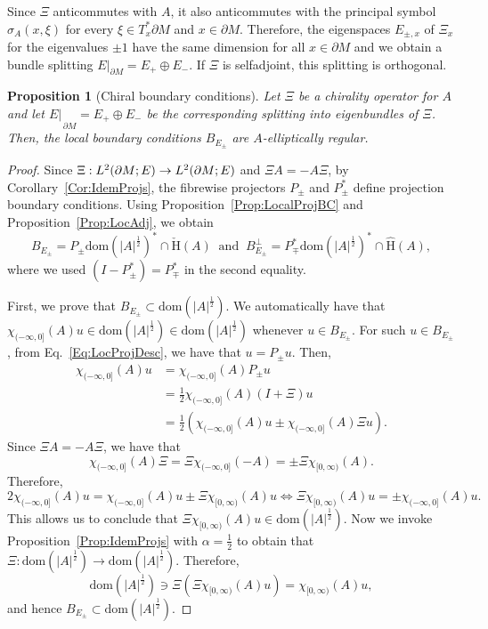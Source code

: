 \documentclass[a4paper,10pt,reqno]{amsart}
\newcommand{\rest}[1]{{{\lvert_{}}_{}}_{#1}}
\newcommand{\cbrac}[1]{\left(#1\right)}
\newcommand{\modulus}[1]{|#1|}
\newcommand{\Lp}[2][{}]{{\rm L}^{#2}_{\rm #1}}%
\newcommand{\checkH}{\check{\mathrm{H}}}
\newcommand{\hatH}{\hat{\mathrm{H}}}
\newcommand{\dom}{\mathrm{dom}}
\newcommand{\dM}{\partial M}
\newtheorem{proposition}[theorem]{Proposition}
\theoremstyle{definition}
\begin{document}
Since $\Xi$ anticommutes with $A$, it also anticommutes with the principal symbol $\sigma_A(x,\xi)$ for every $\xi\in T_x^*\dM$ and $x\in \dM$.
Therefore, the eigenspaces $E_{\pm,x}$ of $\Xi_x$ for the eigenvalues $\pm 1$ have the same dimension for all $x\in\dM$ and we obtain a bundle splitting $E|_{\dM}=E_+\oplus E_-$.
If $\Xi$ is selfadjoint, this splitting is orthogonal.

\begin{proposition}[Chiral boundary conditions]
\label{Prop:ChiralReg}
Let $\Xi$ be a  chirality operator for $A$ and let $E\rest{\dM} = E_+ \oplus E_-$ be the corresponding splitting into eigenbundles of $\Xi$.
Then, the local boundary conditions $B_{E_{\pm}}$ are $A$-elliptically regular.
\end{proposition}
\begin{proof}
Since $\Xi:\Lp{2}(\dM;E) \to \Lp{2}(\dM;E)$ and $\Xi A = - A \Xi$, by Corollary~\ref{Cor:IdemProjs}, the fibrewise projectors $P_{\pm}$ and $P_{\pm}^\ast$ define projection boundary conditions.
Using Proposition~\ref{Prop:LocalProjBC} and Proposition~\ref{Prop:LocAdj}, we obtain
\begin{equation}
\label{Eq:LocProjDesc}
B_{E_{\pm}} 
= 
P_{\pm} \dom(\modulus{A}^{\frac12})^\ast \cap \checkH(A)\ 
\text{ and }\ 
B_{E_{\pm}}^{\perp} 
= 
P_{\mp}^\ast  \dom(\modulus{A}^{\frac12})^\ast \cap \hatH(A),
\end{equation}
where we used $(I - P_{\pm}^\ast) = P_{\mp}^\ast$ in the second equality.

First, we prove that $B_{E_{\pm}} \subset \dom(\modulus{A}^\frac12)$.
We automatically have that $\chi_{(-\infty,0]}(A)u \in \dom(\modulus{A}^{\frac12}) \in \dom(\modulus{A}^\frac12)$ whenever $u \in B_{E_{\pm}}$.
For such $u \in B_{E_{\pm}}$, from Eq.~\eqref{Eq:LocProjDesc}, we have that $u = P_{\pm} u$.
Then,
\begin{align*}
\chi_{(-\infty,0]}(A)u
 & = \chi_{(-\infty,0]}(A)P_{\pm} u           \\
 & = \tfrac12  \chi_{(-\infty,0]}(A)(I + \Xi)u \\
 & = \tfrac12 \cbrac{ \chi_{(-\infty,0]}(A)u \pm \chi_{(-\infty,0]}(A) \Xi u}.
\end{align*}
Since $\Xi A = - A \Xi$, we have that
$$\chi_{(-\infty,0]}(A) \Xi = \Xi \chi_{(-\infty,0]}(-A) = \pm \Xi \chi_{[0,\infty)}(A).$$
Therefore,
$$
2\chi_{(-\infty,0]}(A)u  = \chi_{(-\infty,0]}(A)u \pm \Xi \chi_{[0,\infty)}(A)u \iff \Xi \chi_{[0,\infty)}(A)u = \pm \chi_{(-\infty,0]}(A)u.$$
This allows us to conclude that $\Xi \chi_{[0,\infty)}(A)u  \in \dom(\modulus{A}^{\frac12})$.
Now we invoke Proposition~\ref{Prop:IdemProjs} with $\alpha = \frac12$ to obtain that $\Xi: \dom(\modulus{A}^{\frac12}) \to \dom(\modulus{A}^{\frac12})$.
Therefore,
$$ \dom(\modulus{A}^{\frac12}) \ni \Xi ( \Xi \chi_{[0,\infty)}(A)u) = \chi_{[0,\infty)}(A)u,$$
and hence $B_{E_{\pm}} \subset \dom(\modulus{A}^{\frac12})$.


\end{proof}
\end{document}
